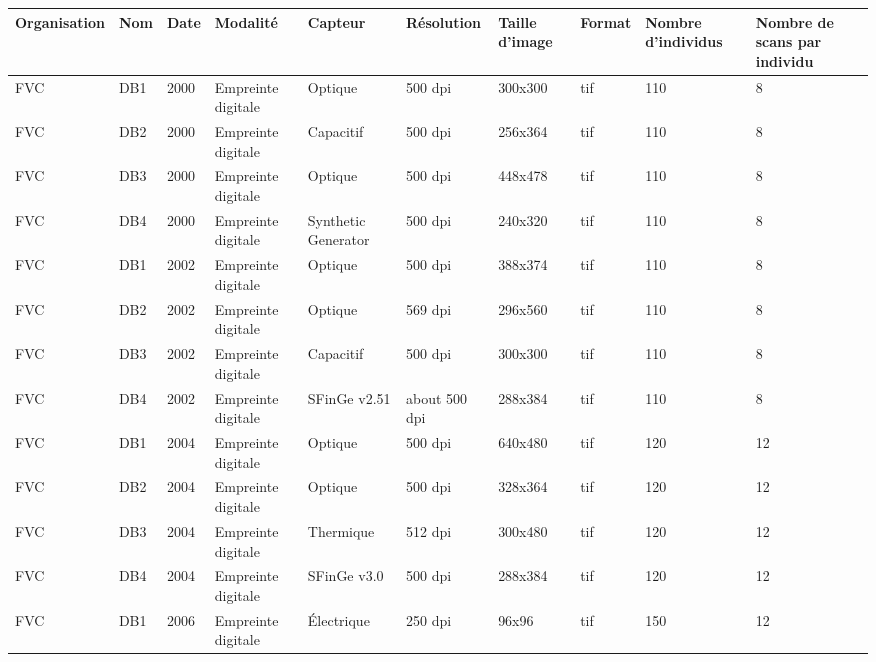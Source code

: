 \begin{sidewaystable}[h!]
	\centering

\begin{tabular}{|p{3cm}|p{1cm}|p{1cm}|p{2cm}|p{2cm}|p{2cm}|p{2cm}|p{2cm}|p{2cm}|p{3cm}|}
	\hline
	\textbf{Organisation} & \textbf{Nom} & \textbf{Date} & \textbf{Modalité} & \textbf{Capteur} & \textbf{Résolution} & \textbf{Taille d'image} & \textbf{Format} & \textbf{Nombre d'individus} & \textbf{Nombre de scans par individu} \\ \hline
	FVC & DB1 & 2000 & Empreinte digitale & Optique & 500 dpi & 300x300 & tif & 110 & 8 \\ \hline
	FVC & DB2 & 2000 & Empreinte digitale & Capacitif & 500 dpi & 256x364 & tif & 110 & 8 \\ \hline
	FVC & DB3 & 2000 & Empreinte digitale & Optique & 500 dpi & 448x478 & tif & 110 & 8 \\ \hline
	FVC & DB4 & 2000 & Empreinte digitale & Synthetic Generator & 500 dpi & 240x320 & tif & 110 & 8 \\ \hline
	FVC & DB1 & 2002 & Empreinte digitale & Optique & 500 dpi & 388x374 & tif & 110 & 8 \\ \hline
	FVC & DB2 & 2002 & Empreinte digitale & Optique & 569 dpi & 296x560 & tif & 110 & 8 \\ \hline
	FVC & DB3 & 2002 & Empreinte digitale & Capacitif & 500 dpi & 300x300 & tif & 110 & 8 \\ \hline
	FVC & DB4 & 2002 & Empreinte digitale & SFinGe v2.51 & about 500 dpi & 288x384 & tif & 110 & 8 \\ \hline
	FVC & DB1 & 2004 & Empreinte digitale & Optique & 500 dpi & 640x480 & tif & 120 & 12 \\ \hline
	FVC & DB2 & 2004 & Empreinte digitale & Optique & 500 dpi & 328x364 & tif & 120 & 12 \\ \hline
	FVC & DB3 & 2004 & Empreinte digitale & Thermique & 512 dpi & 300x480 & tif & 120 & 12 \\ \hline
	FVC & DB4 & 2004 & Empreinte digitale & SFinGe v3.0 & 500 dpi & 288x384 & tif & 120 & 12 \\ \hline
	FVC & DB1 & 2006 & Empreinte digitale & Électrique & 250 dpi & 96x96 & tif & 150 & 12 \\ \hline

\end{tabular}

 

\end{sidewaystable}
